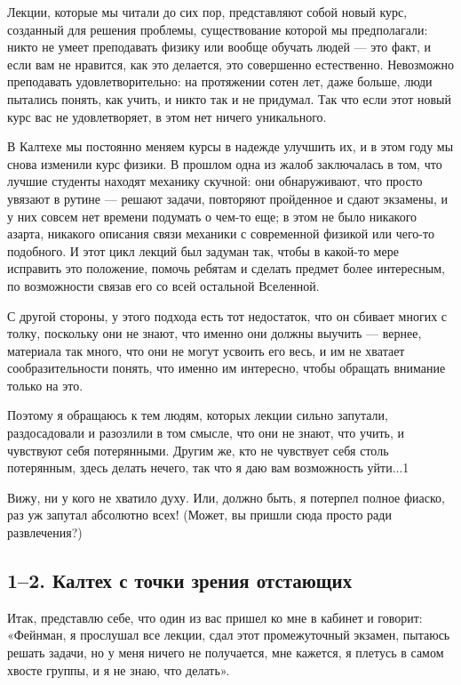 \documentclass[11pt,oneside]{article}
\begin{document}
Лекции, которые мы читали до сих пор, представляют собой новый курс, созданный для решения проблемы, существование которой мы предполагали: никто не умеет преподавать физику или вообще обучать людей --- это факт, и если вам не нравится, как это делается, это совершенно естественно. Невозможно преподавать удовлетворительно: на протяжении сотен лет, даже больше, люди пытались понять, как учить, и никто так и не придумал. Так что если этот новый курс вас не удовлетворяет, в этом нет ничего уникального.\par

В Калтехе мы постоянно меняем курсы в надежде улучшить их, и в этом году мы снова изменили курс физики. В прошлом одна из жалоб заключалась в том, что лучшие студенты находят механику скучной: они обнаруживают, что просто увязают в рутине --- решают задачи, повторяют пройденное и сдают экзамены, и у них совсем нет времени подумать о чем-то еще; в этом не было никакого азарта, никакого описания связи механики с современной физикой или чего-то подобного. И этот цикл лекций был задуман так, чтобы в какой-то мере исправить это положение, помочь ребятам и сделать предмет более интересным, по возможности связав его со всей остальной Вселенной.\par

С другой стороны, у этого подхода есть тот недостаток, что он сбивает многих с толку, поскольку они не знают, что именно они должны выучить --- вернее, материала так много, что они не могут усвоить его весь, и им не хватает сообразительности понять, что именно им интересно, чтобы обращать внимание только на это.\par

Поэтому я обращаюсь к тем людям, которых лекции сильно запутали, раздосадовали и разозлили в том смысле, что они не знают, что учить, и чувствуют себя потерянными. Другим же, кто не чувствует себя столь потерянным, здесь делать нечего, так что я даю вам возможность уйти...1\par

Вижу, ни у кого не хватило духу. Или, должно быть, я потерпел полное фиаско, раз уж запутал абсолютно всех! (Может, вы пришли сюда просто ради развлечения?)\par

\subsection*{1--2. Калтех с точки зрения отстающих}

Итак, представлю себе, что один из вас пришел ко мне в кабинет и говорит: «Фейнман, я прослушал все лекции, сдал этот промежуточный экзамен, пытаюсь решать задачи, но у меня ничего не получается, мне кажется, я плетусь в самом хвосте группы, и я не знаю, что делать».\par
\end{document}
